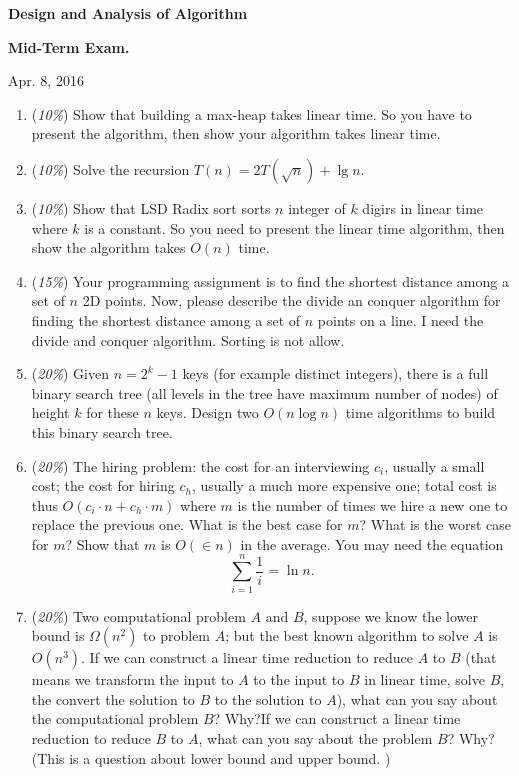 \documentclass[12pt]{article}
\begin{document}
\centerline{\bf Design and Analysis of Algorithm}
\centerline{\bf Mid-Term Exam.}
\centerline{Apr. 8, 2016}
\begin{enumerate}
\item ({\it{10\%}}) Show that building a max-heap takes linear time.  So you have to present the algorithm, then show your algorithm takes linear time. 

\item ({\it{10\%}}) Solve the recursion $T(n)=2T(\sqrt{n}) + \lg n.$

\item ({\it{10\%}}) Show that LSD Radix sort sorts $n$ integer of $k$ digirs in linear time where $k$ is a constant. So you need to present the linear time algorithm, then show the algorithm  takes $O(n)$ time. 

\item ({\it{15\%}}) Your programming assignment is to find the shortest distance among a set of $n$ 2D points. Now, please describe the divide an conquer algorithm for finding the shortest distance among a set of $n$ points on a line. I need the divide and conquer algorithm. Sorting is not allow. 

\item ({\it{20\%}}) Given $n=2^k-1$ keys (for example distinct integers), there is a full binary search tree (all levels in the tree have maximum number of nodes) of height $k$ for these $n$ keys. Design two $O(n\log n)$ time algorithms to build this binary search tree. 

\item ({\it{20\%}}) The hiring problem: the cost for an interviewing $c_i$, usually a small cost; the cost for hiring $c_h
$, usually a much more expensive one; total cost is thus $O(c_i\cdot n+ c_h\cdot m)$ where $m$ is the number of times we hire a new one to replace the previous one. What is the best case for $m$? What is the worst case for $m$? Show that $m$ is $O(\in n)$ in the average. You may need the equation $$\sum_{i=1}^n \frac{1}{i} = \ln n.$$

\item ({\it{20\%}}) Two computational problem $A$ and $B$, suppose we know the lower bound is $\Omega(n^2)$ to problem $A$; but the best known algorithm to solve $A$ is $O(n^3)$.  If we can construct a linear time reduction to reduce $A$ to $B$ (that means we transform the input to $A$ to the input to $B$ in linear time, solve $B$, the convert the solution to $B$ to the solution to $A$), what can you say about the computational problem $B$? Why?If we can construct a linear time reduction to reduce $B$ to $A$, what can you say about the problem $B$?  Why? (This is a question about lower bound and upper bound. )
\end{enumerate}
\end{document}
